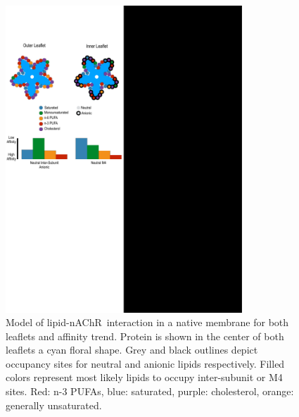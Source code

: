 \documentclass[preprint,3p,9pt,times,onecolumn]{elsarticle}
\newcommand{\nachr}{nAChR}
\begin{document}

\begin{figure}
	\center
	\includegraphics[width=3.5in]{Summary.pdf}
	\caption{Model of lipid-\nachr~interaction in a native membrane for both leaflets and affinity trend. Protein is shown in the center of both leaflets a cyan floral shape. Grey and black outlines depict occupancy sites for neutral and anionic lipids respectively. Filled colors represent most likely lipids to occupy inter-subunit or M4 sites. Red: n-3 PUFAs, blue: saturated, purple: cholesterol, orange: generally unsaturated. }
	\label{fig:sum}
\end{figure}
\end{document}

